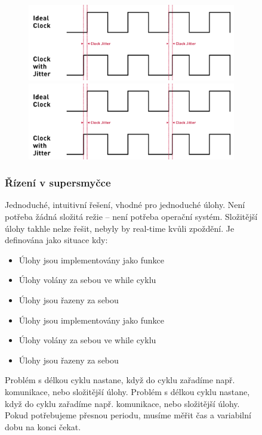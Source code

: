 \begin{figure}[h]
\begin{figure}[h]
  \begin{center}
    \includegraphics[scale = 1]{img/Picture24.png}
  \end{center}
    \begin{center}
        \includegraphics[scale = 1]{img/Picture24.png}
    \end{center}
\end{figure}

\subsubsection*{Řízení v supersmyčce}
Jednoduché, intuitivní řešení, vhodné pro jednoduché úlohy. Není potřeba žádná složitá režie – není potřeba operační systém. Složitější úlohy takhle nelze řešit, nebyly by real-time kvůli zpoždění.
Je definována jako situace kdy:
\begin{itemize}
  \item Úlohy jsou implementovány jako funkce
  \item Úlohy volány za sebou ve while cyklu
  \item Úlohy jsou řazeny za sebou
    \item Úlohy jsou implementovány jako funkce
    \item Úlohy volány za sebou ve while cyklu
    \item Úlohy jsou řazeny za sebou
\end{itemize}
Problém s délkou cyklu nastane, když do cyklu zařadíme např. komunikace, nebo složitější úlohy. 
Problém s délkou cyklu nastane, když do cyklu zařadíme např. komunikace, nebo složitější úlohy.
Pokud potřebujeme přesnou periodu, musíme měřit čas a variabilní dobu na konci čekat.


\end{figure}
